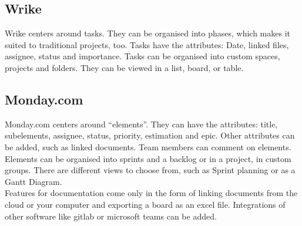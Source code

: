 \subsection*{Wrike}
Wrike centers around tasks. They can be organised into phases, which makes it suited to traditional projects, too. Tasks have the attributes: Date, linked files, assignee, status and importance. Tasks can be organised into custom spaces, projects and folders. They can be viewed in a list, board, or table.

\subsection*{Monday.com}
Monday.com centers around “elements”. They can have the attributes: title, subelements, assignee, status, priority, estimation and epic. Other attributes can be added, such as linked documents. Team members can comment on elements.
Elements can be organised into sprints and a backlog or in a project, in custom groups. There are different views to choose from, such as Sprint planning or as a Gantt Diagram.\\
Features for documentation come only in the form of linking documents from the cloud or your computer and exporting a board as an excel file. Integrations of other software like gitlab or microsoft teams can be added.


